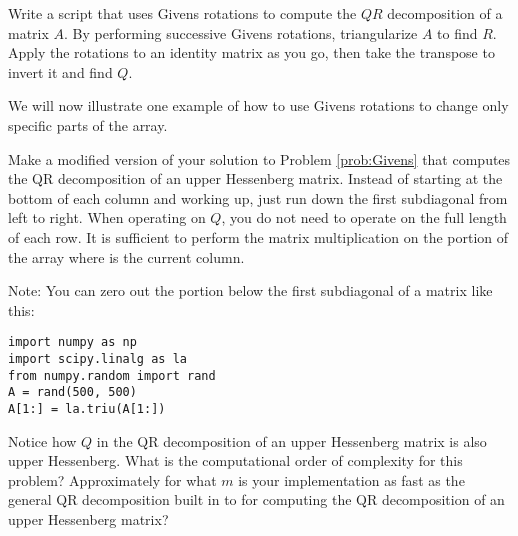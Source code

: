 \begin{problem}
\label{prob:Givens}
Write a script that uses Givens rotations to compute the $QR$ decomposition of a matrix $A$.
By performing successive Givens rotations, triangularize $A$ to find $R$.
Apply the rotations to an identity matrix as you go, then take the transpose to invert it and find $Q$.
\end{problem}

We will now illustrate one example of how to use Givens rotations to change only specific parts of the array.

\begin{problem}
\label{prob:givens_hessenberg}
Make a modified version of your solution to Problem \ref{prob:Givens} that computes the QR decomposition of an upper Hessenberg matrix.
Instead of starting at the bottom of each column and working up, just run down the first subdiagonal from left to right.
When operating on $Q$, you do not need to operate on the full length of each row.
It is sufficient to perform the matrix multiplication on the portion of the array  where  is the current column.

Note: You can zero out the portion below the first subdiagonal of a matrix like this:
\begin{lstlisting}
import numpy as np
import scipy.linalg as la
from numpy.random import rand
A = rand(500, 500)
A[1:] = la.triu(A[1:])
\end{lstlisting}

Notice how $Q$ in the QR decomposition of an upper Hessenberg matrix is also upper Hessenberg.
What is the computational order of  complexity for this problem?
Approximately for what $m$ is your implementation as fast as the general QR decomposition built in to  for computing the QR decomposition of an upper Hessenberg matrix?
\end{problem}

